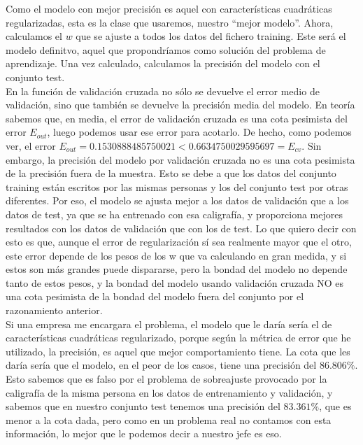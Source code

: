 \documentclass{article}
\begin{document}
Como el modelo con mejor precisión es aquel con características cuadráticas regularizadas, esta es la clase que usaremos, nuestro ``mejor modelo''. Ahora, calculamos el $w$ que se ajuste a todos los datos del fichero training. Este será el modelo definitvo, aquel que propondríamos como solución del problema de aprendizaje. Una vez calculado, calculamos la precisión del modelo con el conjunto test.\\

En la función de validación cruzada no sólo se devuelve el error medio de validación, sino que también se devuelve la precisión media del modelo. En teoría sabemos que, en media, el error de validación cruzada es una cota pesimista del error $E_{out}$, luego podemos usar ese error para acotarlo. De hecho, como podemos ver, el error $E_{out} = 0.1530888485750021 < 0.6634750029595697 = E_{cv}$. Sin embargo, la precisión del modelo por validación cruzada no es una cota pesimista de la precisión fuera de la muestra. Esto se debe a que los datos del conjunto training están escritos por las mismas personas y los del conjunto test por otras diferentes. Por eso, el modelo se ajusta mejor a los datos de validación que a los datos de test, ya que se ha entrenado con esa caligrafía, y proporciona mejores resultados con los datos de validación que con los de test. Lo que quiero decir con esto es que, aunque el error de regularización sí sea realmente mayor que el otro, este error depende de los pesos de los w que va calculando en gran medida, y si estos son más grandes puede dispararse, pero la bondad del modelo no depende tanto de estos pesos, y la bondad del modelo usando validación cruzada NO es una cota pesimista de la bondad del modelo fuera del conjunto por el razonamiento anterior.\\

Si una empresa me encargara el problema, el modelo que le daría sería el de características cuadráticas regularizado, porque según la métrica de error que he utilizado, la precisión, es aquel que mejor comportamiento tiene. La cota que les daría sería que el modelo, en el peor de los casos, tiene una precisión del $86.806\%$. Esto sabemos que es falso por el problema de sobreajuste provocado por la caligrafía de la misma persona en los datos de entrenamiento y validación, y sabemos que en nuestro conjunto test tenemos una precisión del $83.361\%$, que es menor a la cota dada, pero como en un problema real no contamos con esta información, lo mejor que le podemos decir a nuestro jefe es eso.\\
\end{document}
